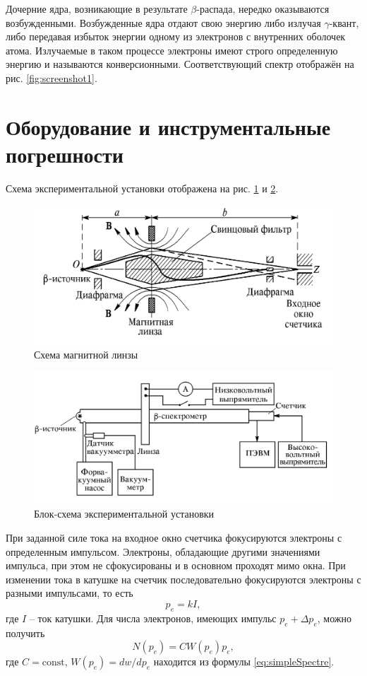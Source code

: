 \documentclass[a4paper]{article}
\newcommand{\const}{\mathrm{const}}
\newcommand{\gmm}{$\gamma $}
\newcommand{\btt}{$\beta $}
\begin{document}
	Дочерние ядра, возникающие в результате \btt-распада, нередко оказываются возбужденными. Возбужденные ядра отдают свою энергию	либо излучая \gmm-квант, либо передавая избыток энергии одному из электронов с внутренних оболочек атома. Излучаемые в таком	процессе электроны имеют строго определенную энергию и называются конверсионными.
	Соответствующий спектр отображён на рис. \ref{fig:screenshot1}.
		
	\section{Оборудование и инструментальные погрешности}
		
	Схема экспериментальной установки отображена на рис. \ref{fig:screenshot2} и \ref{fig:screenshot3}.
	\begin{figure}
		\centering
		\includegraphics[width=0.7\linewidth]{Screenshot_2}
		\caption{Схема магнитной линзы}
		\label{fig:screenshot2}
	\end{figure}
	\begin{figure}
		\centering
		\includegraphics[width=0.7\linewidth]{Screenshot_3}
		\caption{Блок-схема экспериментальной установки}
		\label{fig:screenshot3}
	\end{figure}
	При заданной силе тока на входное окно счетчика фокусируются электроны с определенным импульсом. Электроны, обладающие другими значениями импульса, при этом не сфокусированы и в основном проходят мимо окна. При изменении тока в катушке на счетчик последовательно фокусируются электроны с разными	импульсами, то есть
	\begin{equation*}\label{eq:impulse}
		p_e = k I,
	\end{equation*}
	где $ I $ -- ток катушки.
	Для числа электронов, имеющих импульс $ p_e+\Delta p_e $, можно получить
	\begin{equation*}\label{eq:n_ot_Pe}
		N(p_e) = C W(p_e) p_e,
	\end{equation*}
	где $ C = \const $, $ W(p_e) = d w / d p_e $ находится из формулы \eqref{eq:simpleSpectre}.
	
\end{document}
